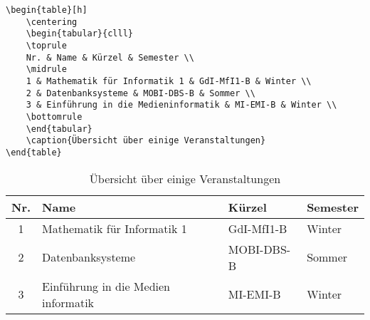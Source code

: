 \begin{verbatim}
\begin{table}[h]
	\centering
	\begin{tabular}{clll}
	\toprule
	Nr. & Name & Kürzel & Semester \\
	\midrule
	1 & Mathematik für Informatik 1 & GdI-MfI1-B & Winter \\
	2 & Datenbanksysteme & MOBI-DBS-B & Sommer \\
	3 & Einführung in die Medieninformatik & MI-EMI-B & Winter \\		
	\bottomrule
	\end{tabular}
	\caption{Übersicht über einige Veranstaltungen}
\end{table}
\end{verbatim}

\begin{table}[h]
	\centering
	\begin{tabular}{clll}
		\toprule
		Nr.	&	Name						&	Kürzel		&	Semester	\\
		\midrule
		1	&	Mathematik für Informatik 1	&	GdI-MfI1-B	&	Winter		\\
		2	&	Datenbanksysteme			&	MOBI-DBS-B	&	Sommer		\\
		3	&	Einführung in die Medien
		informatik							&	MI-EMI-B	&	Winter		\\		
		\bottomrule
	\end{tabular}
	\caption{Übersicht über einige Veranstaltungen}
\end{table}